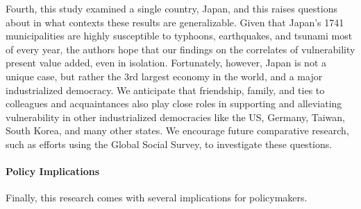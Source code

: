 \documentclass[]{elsarticle} %
\begin{document}
Fourth, this study examined a single country, Japan, and this raises
questions about in what contexts these results are generalizable. Given
that Japan's 1741 municipalities are highly susceptible to typhoons,
earthquakes, and tsunami most of every year, the authors hope that our
findings on the correlates of vulnerability present value added, even in
isolation. Fortunately, however, Japan is not a unique case, but rather
the 3rd largest economy in the world, and a major industrialized
democracy. We anticipate that friendship, family, and ties to colleagues
and acquaintances also play close roles in supporting and alleviating
vulnerability in other industrialized democracies like the US, Germany,
Taiwan, South Korea, and many other states. We encourage future
comparative research, such as efforts using the Global Social Survey, to
investigate these questions.

\hypertarget{policy-implications}{%
\paragraph{Policy Implications}\label{policy-implications}}

Finally, this research comes with several implications for policymakers.
\end{document}
